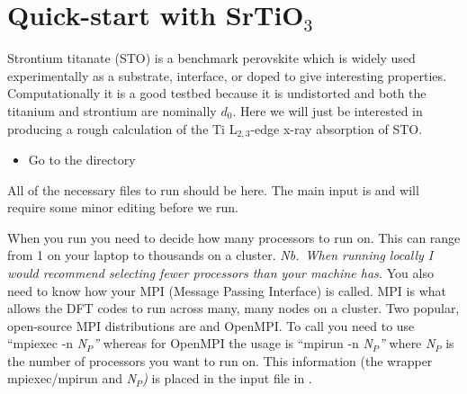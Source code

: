 \documentclass[11pt]{report}
\begin{document}
\section{Quick-start with SrTiO$_3$}

Strontium titanate (STO) is a benchmark perovskite which is widely used experimentally as a substrate, interface, or doped to give interesting properties. 
Computationally it is a good testbed because it is undistorted and both the titanium and strontium are nominally $d_0$. Here we will just be interested in producing a rough calculation of the Ti L$_{2,3}$-edge x-ray absorption of STO.
\begin{itemize}
\item Go to the  directory
\end{itemize}
All of the necessary files to run should be here. The main input is  and will require some minor editing before we run. 

When you run  you need to decide how many processors to run on. This can range from 1 on your laptop to thousands on a cluster. {\it Nb.\ When running locally I would recommend selecting fewer processors than your machine has.} You also need to know how your MPI (Message Passing Interface) is called. MPI is what allows the DFT codes to run across many, many nodes on a cluster. Two popular, open-source MPI distributions are  and OpenMPI. To call  you need to use ``mpiexec -n {\it N$_P$''} whereas for OpenMPI the usage is ``mpirun -n {\it N$_P$''} where {\it N$_P$} is the number of processors you want to run on. This information (the wrapper mpiexec/mpirun and {\it N$_P$)} is placed in the input file in .
\end{document}
